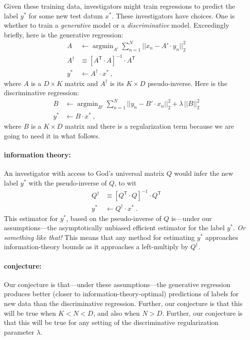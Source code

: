 \documentclass[12pt]{article}
\newcommand{\T}{^{{\mathsf T}}}
\newcommand{\inv}{^{-1}}
\DeclareMathOperator*{\argmin}{argmin}
\begin{document}
Given these training data, investigators might train regressions to
predict the label $y^\ast$ for some new test datum $x^\ast$.
These investigators have choices.
One is whether to train a \emph{generative} model or a
\emph{discriminative} model.
Exceedingly briefly, here is the generative regression:
\begin{align}\label{eq:gen}
A &\leftarrow \argmin_{A'} \sum_{n=1}^N ||x_n - A'\cdot y_n||_2^2 \\
A^\dagger &\equiv [A\T\cdot A]\inv \cdot A\T \\
y^\ast &\leftarrow A^\dagger\cdot x^\ast
~,
\end{align}
where $A$ is a $D\times K$ matrix and $A^\dagger$ is its $K\times D$
pseudo-inverse.
Here is the discriminative regression:
\begin{align}\label{eq:dis}
B &\leftarrow \argmin_{B'} \sum_{n=1}^N ||y_n - B'\cdot x_n||_2^2 + \lambda\,||B||_2^2 \\
y^\ast &\leftarrow B\cdot x^\ast
~,
\end{align}
where $B$ is a $K\times D$ matrix and there is a regularization term
because we are going to need it in what follows.

\paragraph{information theory:}
An investigator with access to God's universal matrix $Q$ would infer
the new label $y^\ast$ with the pseudo-inverse of $Q$, to wit
\begin{align}
Q^\dagger &\equiv [Q\T\cdot Q]\inv \cdot Q\T \\
y^\ast &\leftarrow Q^\dagger\cdot x^\ast
~.
\end{align}
This estimator for $y^\ast$, based on the pseudo-inverse of $Q$
is---under our assumptions---the asymptotically unbiased efficient
estimator for the label $y^\ast$. \emph{Or something like that!}
This means that any method for estimating $y^\ast$ approaches
information-theory bounds as it approaches a left-multiply by
$Q^\dagger$.

\paragraph{conjecture:}
Our conjecture is that---under these assumptions---the generative
regression produces better (closer to information-theory-optimal)
predictions of labels for new data than the discriminative regression.
Further, our conjecture is that this will be true when $K<N<D$, and
also when $N > D$.
Further, our conjecture is that this will be true for any setting of
the discriminative regularization parameter $\lambda$.
\end{document}
